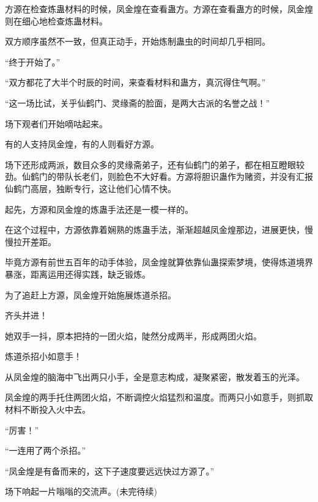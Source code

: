 \begin{this_body}
方源在检查炼蛊材料的时候，凤金煌在查看蛊方。方源在查看蛊方的时候，凤金煌则在细心地检查炼蛊材料。

双方顺序虽然不一致，但真正动手，开始炼制蛊虫的时间却几乎相同。

“终于开始了。”

“双方都花了大半个时辰的时间，来查看材料和蛊方，真沉得住气啊。”

“这一场比试，关乎仙鹤门、灵缘斋的脸面，是两大古派的名誉之战！”

场下观者们开始嘀咕起来。

有的人支持凤金煌，有的人则看好方源。

场下还形成两派，数目众多的灵缘斋弟子，还有仙鹤门的弟子，都在相互瞪眼较劲。仙鹤门的带队长老们，则脸色不大好看。方源将胆识蛊作为赌资，并没有汇报仙鹤门高层，独断专行，这让他们心情不快。

起先，方源和凤金煌的炼蛊手法还是一模一样的。

在这个过程中，方源依靠着娴熟的炼蛊手法，渐渐超越凤金煌那边，进展更快，慢慢拉开差距。

毕竟方源有前世五百年的动手体验，凤金煌就算依靠仙蛊探索梦境，使得炼道境界暴涨，距离运用还得实践，缺乏锻炼。

为了追赶上方源，凤金煌开始施展炼道杀招。

齐头并进！

她双手一抖，原本把持的一团火焰，陡然分成两半，形成两团火焰。

炼道杀招小如意手！

从凤金煌的脑海中飞出两只小手，全是意志构成，凝聚紧密，散发着玉的光泽。

凤金煌的两手托住两团火焰，不断调控火焰猛烈和温度。而两只小如意手，则抓取材料不断投入火中去。

“厉害！”

“一连用了两个杀招。”

“凤金煌是有备而来的，这下子速度要远远快过方源了。”

场下响起一片嗡嗡的交流声。(未完待续)

\end{this_body}

